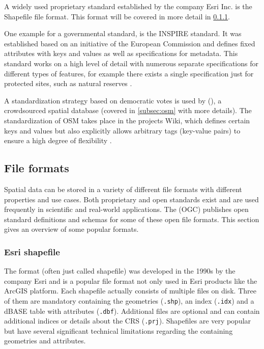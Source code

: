 			A widely used proprietary standard established by the company Esri Inc. is the Shapefile file format.
			This format will be covered in more detail in \cref{subsubsec:shapefile}.
			
			One example for a governmental standard, is the INSPIRE standard.
			It was established based on an initiative of the European Commission and defines fixed attributes with keys and values as well as specifications for metadata.
			This standard works on a high level of detail with numerous separate specifications for different types of features, for example there exists a single specification just for protected sites, such as natural reserves \cite[31]{inspire-protected-sites}.
		
			A standardization strategy based on democratic votes is used by  (), a crowdsourced spatial database (covered in \cref{subsec:osm} with more details).
			The standardization of OSM takes place in the projects Wiki, which defines certain keys and values but also explicitly allows arbitrary tags (key-value pairs) to ensure a high degree of flexibility \cite{osm-wiki-proposal-process}.
			
	\subsection{File formats}
	\label{subsec:file-formats}
	
		Spatial data can be stored in a variety of different file formats with different properties and use cases.
		Both proprietary and open standards exist and are used frequently in scientific and real-world applications.
		The  (OGC) publishes open standard definitions and schemas for some of these open file formats.
		This section gives an overview of some popular formats.
		
		\subsubsection{Esri shapefile}
		\label{subsubsec:shapefile}
		
			The  format (often just called shapefile) was developed in the 1990s by the company Esri and is a popular file format not only used in Esri products like the ArcGIS platform.
			Each shapefile actually consists of multiple files on disk\cite{esri-shapefile-file-ext-spec}.
			Three of them are mandatory containing the geometries (\texttt{.shp}), an index (\texttt{.idx}) and a dBASE table with attributes (\texttt{.dbf}).
			Additional files are optional and can contain additional indices or details about the CRS (\texttt{.prj}).
			Shapefiles are very popular\cite{spatial-file-formats-trends} but have several significant technical limitations regarding the containing geometries and attributes.
			
